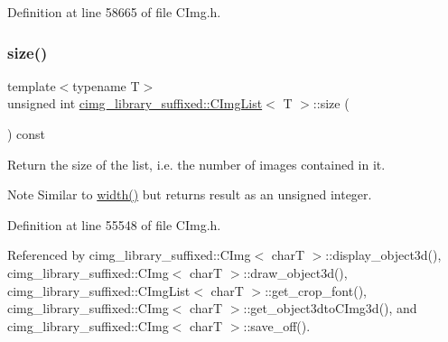Definition at line 58665 of file C\+Img.\+h.

\mbox{\label{structcimg__library__suffixed_1_1CImgList_aee903f446b109a60b1107be84f31b01e}} 
\subsubsection{\texorpdfstring{size()}{size()}}
{\footnotesize\ttfamily template$<$typename T$>$ \\
unsigned int \hyperlink{structcimg__library__suffixed_1_1CImgList}{cimg\+\_\+library\+\_\+suffixed\+::\+C\+Img\+List}$<$ T $>$\+::size (\begin{DoxyParamCaption}{ }\end{DoxyParamCaption}) const\hspace{0.3cm}{\ttfamily [inline]}}



Return the size of the list, i.\+e. the number of images contained in it. 

\begin{DoxyNote}{Note}
Similar to \hyperlink{structcimg__library__suffixed_1_1CImgList_a60d81967a11f946a46ab28f2f14109f7}{width()} but returns result as an unsigned integer. 
\end{DoxyNote}


Definition at line 55548 of file C\+Img.\+h.



Referenced by cimg\+\_\+library\+\_\+suffixed\+::\+C\+Img$<$ char\+T $>$\+::display\+\_\+object3d(), cimg\+\_\+library\+\_\+suffixed\+::\+C\+Img$<$ char\+T $>$\+::draw\+\_\+object3d(), cimg\+\_\+library\+\_\+suffixed\+::\+C\+Img\+List$<$ char\+T $>$\+::get\+\_\+crop\+\_\+font(), cimg\+\_\+library\+\_\+suffixed\+::\+C\+Img$<$ char\+T $>$\+::get\+\_\+object3dto\+C\+Img3d(), and cimg\+\_\+library\+\_\+suffixed\+::\+C\+Img$<$ char\+T $>$\+::save\+\_\+off().

